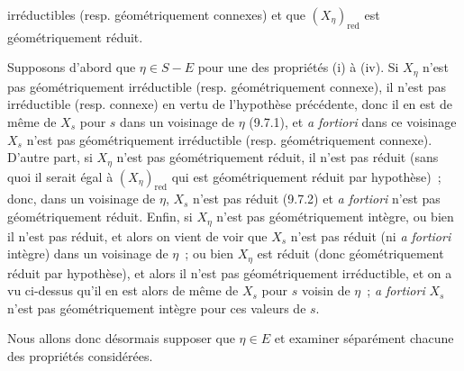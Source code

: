
irréductibles (resp. géométriquement connexes) et que $(X_\eta)_{\mathrm{red}}$
est géométriquement réduit.

Supposons d'abord que $\eta\in S-E$ pour une des propriétés (i) à (iv). Si
$X_\eta$ n'est pas géométriquement irréductible (resp. géométriquement connexe),
il n'est pas irréductible (resp. connexe) en vertu de l'hypothèse précédente,
donc il en est de même de $X_s$ pour $s$ dans un voisinage de $\eta$ (9.7.1), et
\emph{a fortiori} dans ce voisinage $X_s$ n'est pas géométriquement irréductible
(resp. géométriquement connexe). D'autre part, si $X_\eta$ n'est pas
géométriquement réduit, il n'est pas réduit (sans quoi il serait égal à
$(X_\eta)_{\mathrm{red}}$ qui est géométriquement réduit par hypothèse)~; donc,
dans un voisinage de $\eta$, $X_s$ n'est pas réduit (9.7.2) et \emph{a fortiori}
n'est pas géométriquement réduit. Enfin, si $X_\eta$ n'est pas géométriquement
intègre, ou bien il n'est pas réduit, et alors on vient de voir que $X_s$ n'est
pas réduit (ni \emph{a fortiori} intègre) dans un voisinage de $\eta$~; ou bien
$X_\eta$ est réduit (donc géométriquement réduit par hypothèse), et alors il
n'est pas géométriquement irréductible, et on a vu ci-dessus qu'il en est alors
de même de $X_s$ pour $s$ voisin de $\eta$~; \emph{a fortiori} $X_s$ n'est pas
géométriquement intègre pour ces valeurs de $s$.

Nous allons donc désormais supposer que $\eta\in E$ et examiner séparément
chacune des propriétés considérées.

